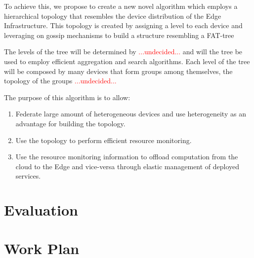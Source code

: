 To achieve this, we propose to create a new novel algorithm which employs a hierarchical topology that resembles the device distribution of the Edge Infrastructure. This topology is created by assigning a level to each device and leveraging on gossip mechanisms to build a structure resembling a FAT-tree 

The levels of the tree will be determined by \textcolor{red}{...undecided...} and will the tree be used to employ efficient aggregation and search algorithms. Each level of the tree will be composed by many devices that form groups among themselves, the topology of the groups \textcolor{red}{...undecided...} 

The purpose of this algorithm is to allow:

\begin{enumerate} 

    \item Federate large amount of heterogeneous devices and use heterogeneity as an advantage for building the topology. 
    
    \item Use the topology to perform efficient resource monitoring.
    
    \item Use the resource monitoring information to offload computation from the cloud to the Edge and vice-versa through elastic management of deployed services.
    
    
\end{enumerate}

\section{Evaluation}

\section{Work Plan}